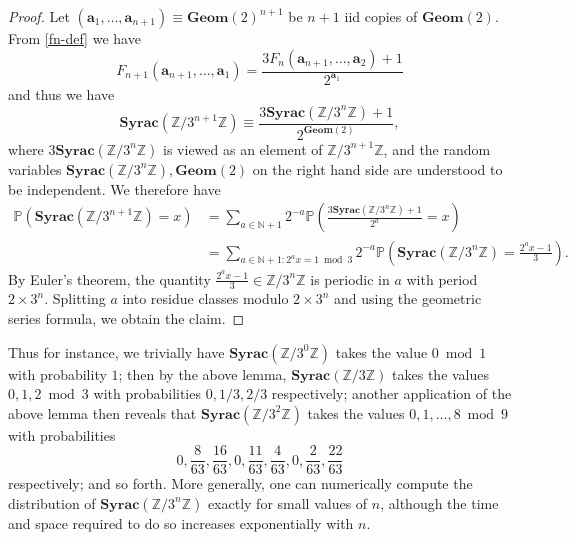 \documentclass[12pt,a4paper,reqno]{amsart}
\numberwithin{equation}{section}
\theoremstyle{plain}
\theoremstyle{definition}
\renewcommand\P{\mathbb{P}}
\newcommand\Z{\mathbb{Z}}
\newcommand\N{\mathbb{N}}
\renewcommand\a{\mathbf{a}}
\newcommand\Geom{\mathbf{Geom}}
\newcommand\Syrac{\mathbf{Syrac}}
\renewcommand{\mod}{\bmod}
\begin{document}
\begin{proof}  Let $(\a_1,\dots,\a_{n+1}) \equiv \Geom(2)^{n+1}$ be $n+1$ iid copies of $\Geom(2)$.  From \eqref{fn-def} we have
$$ F_{n+1}(\a_{n+1},\dots,\a_{1}) = \frac{3 F_n(\a_{n+1},\dots,\a_2)+1}{2^{\a_{1}}}$$
and thus we have
$$ \Syrac(\Z/3^{n+1}\Z) \equiv \frac{3\Syrac(\Z/3^n\Z)+1}{2^{\Geom(2)}},$$
where $3\Syrac(\Z/3^n\Z)$ is viewed as an element of $\Z/3^{n+1}\Z$, and the random variables $\Syrac(\Z/3^n\Z), \Geom(2)$ on the right hand side are understood to be independent.  We therefore have 
\begin{align*}
 \P( \Syrac(\Z/3^{n+1}\Z) = x ) &= \sum_{a \in \N+1} 2^{-a} \P\left( \frac{3\Syrac(\Z/3^n\Z)+1}{2^a} = x \right) \\
&= \sum_{a \in \N+1: 2^a x = 1 \mod 3} 2^{-a} \P\left( \Syrac(\Z/3^n\Z) = \frac{2^a x-1}{3} \right).
\end{align*}
By Euler's theorem, the quantity $\frac{2^a x-1}{3} \in \Z/3^n \Z$ is periodic in $a$ with period $2 \times 3^n$.  Splitting $a$ into residue classes modulo $2 \times 3^n$ and using the geometric series formula, we obtain the claim.
\end{proof}

Thus for instance, we trivially have $\Syrac(\Z/3^0\Z)$ takes the value $0 \mod 1$ with probability $1$; then by the above lemma, $\Syrac(\Z/3\Z)$ takes the values $0,1,2 \mod 3$ with probabilities $0, 1/3, 2/3$ respectively; another application of the above lemma then reveals that $\Syrac(\Z/3^2\Z)$ takes the values $0,1,\dots,8 \mod 9$ with probabilities
$$ 0, \frac{8}{63}, \frac{16}{63}, 0, \frac{11}{63}, \frac{4}{63}, 0, \frac{2}{63}, \frac{22}{63} $$
respectively; and so forth. More generally, one can numerically compute the distribution of $\Syrac(\Z/3^n\Z)$ exactly for small values of $n$, although the time and space required to do so increases exponentially with $n$.
\end{document}
